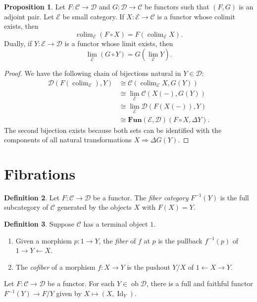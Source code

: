 \documentclass[10pt,letterpaper,cm]{nupset}
\theoremstyle{definition}
\newtheorem{definition}{Definition}[section]
\theoremstyle{theorem}
\newtheorem{prop}[definition]{Proposition}
\theoremstyle{remark}
\newcommand{\1}{\mathbf{1}}
\renewcommand{\c}{\mathscr{C}}
\renewcommand{\d}{\mathscr{D}}
\newcommand{\e}{\mathscr{E}}
\newcommand{\0}{\vec 0}
\DeclareMathOperator{\id}{Id}
\DeclareMathOperator{\ob}{ob}
\DeclareMathOperator{\colim}{colim}
\begin{document}
\begin{prop}
Let $F: \c \to \d$ and $G : \d \to \c$ be functors such that $\left(F, G\right)$ is an adjoint pair. Let $\e$ be small category. If $X: \e \to \c$ is a functor whose colimit exists, then $$\colim_{\e}(F \circ X) = F(\colim_{\e} X).$$
Dually, if $Y: \e \to \d$ is a functor whose limit exists, then $$ \lim_{\e}(G \circ Y)=  G(\lim_{\e} Y) .$$ 
\end{prop}
\begin{proof}
We have the following chain of bijections  natural in $Y \in \d$: 
\begin{align*}
 \d(F(\colim_{\e}), Y) & \cong \c(\colim_{\e} X, G(Y)) 
 \\ & \cong \lim_{\e} \c(X(-), G(Y))
 \\ &  \cong \lim_{\e} \d(F(X(-)), Y)
 \\ &  \cong \mathbf{Fun}(\e, \d)(F \circ X, \Delta{Y}).
 \end{align*} The second bijection exists because both sets can be identified with the components of all natural transformations $X \Rightarrow \Delta{G}(Y)$.
\end{proof}

\section{Fibrations}

\begin{definition}
Let $F : \c \to \d$ be a functor. The \textit{fiber category} $F^{{-1}}(Y)$ is the full subcategory of $\c$ generated by the objects $X$ with $F(X) =Y$.
\end{definition}

\begin{definition}
Suppose $\c$ has a terminal object $1$. 
\begin{enumerate}
\item Given a morphism $p: 1 \to Y$, the \textit{fiber} of $f$ at $p$ is the pullback $f^{{-1}}(p)$ of $1 \rightarrow Y \leftarrow X$.
\item The \textit{cofiber} of a morphism $f: X \to Y$ is the pushout $Y/X$ of  $1 \leftarrow X \rightarrow Y$. 
\end{enumerate}
\end{definition}

\smallskip

Let $F : \c \to \d$ be a functor. For each $Y \in \ob \d$, there is a full and faithful functor $F^{{-1}}(Y)  \to F/Y$ given by $X \mapsto \left(X, \id_Y\right)$. 
\end{document}
